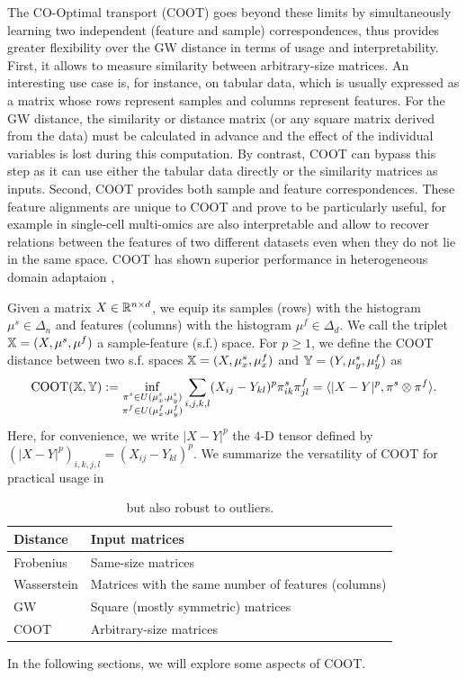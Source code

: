 The CO-Optimal transport (COOT) \citep{Redko20,Chowdhury21b} goes beyond these limits by
simultaneously learning two independent (feature and sample) correspondences,
thus provides greater flexibility over the GW distance in terms of usage and interpretability.
First, it allows to measure similarity between arbitrary-size matrices. An interesting use case is,
for instance, on tabular data, which is usually expressed as a matrix whose rows represent samples
and columns represent features. For the GW distance, the similarity or distance matrix
(or any square matrix derived from the data) must be calculated in advance and
the effect of the individual variables is lost during this computation. By contrast,
COOT can bypass this step as it can use either the tabular data directly or
the similarity matrices as inputs. Second, COOT provides both sample and feature correspondences.
These feature alignments are unique to COOT and prove to be particularly useful,
for example in single-cell multi-omics \citep{Demetci20b}
are also interpretable and allow to recover relations between the features of
two different datasets even when they do not lie in the same space.
COOT has shown superior performance in heterogeneous domain adaptaion \citep{Redko20},

Given a matrix $X \in \mathbb R^{n \times d}$,
we equip its samples (rows) with the histogram $\mu^s \in \Delta_n$ and features (columns)
with the histogram $\mu^f \in \Delta_d$.
We call the triplet $\mathbb X = (X, \mu^s, \mu^f)$ a sample-feature (s.f.) space.
For $p \geq 1$, we define the COOT distance between two s.f. spaces
$\mathbb X = (X, \mu_x^s, \mu_x^f)$ and $\mathbb Y = (Y, \mu_y^s, \mu_y^f)$ as
\begin{align*}
    \text{COOT}(\mathbb X, \mathbb Y) :=
    \inf_{\substack{\pi^s \in U(\mu_x^s, \mu_y^s) \\ \pi^f \in U(\mu_x^f, \mu_y^f)}}
    \sum_{i,j,k,l} (X_{ij} - Y_{kl})^p \pi^s_{ik} \pi^f_{jl}
    = \langle |X - Y|^p, \pi^s \otimes \pi^f \rangle.
\end{align*}
Here, for convenience, we write $|X - Y|^p$ the $4$-D tensor defined by
$(|X - Y|^p)_{i,k,j,l} = (X_{ij} - Y_{kl})^p$. We summarize the versatility of COOT for practical
usage in 
\begin{table}[h]
	\centering
		\begin{tabular}{|l|l|}
    \hline
    Distance & Input matrices \\
    \hline
    Frobenius & Same-size matrices \\
    Wasserstein & Matrices with the same number of features (columns) \\
    GW & Square (mostly symmetric) matrices \\
    COOT & Arbitrary-size matrices \\
    \hline
		\end{tabular}
		\caption{but also robust to outliers.
    \label{t:comparisons}}
\end{table}
In the following sections, we will explore some aspects of COOT.

